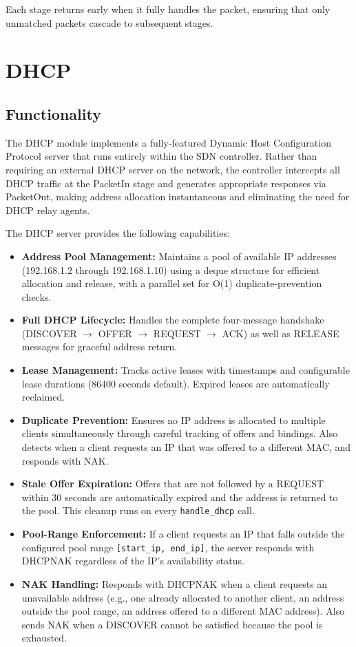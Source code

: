 \documentclass[12pt,a4paper]{article}
\begin{document}
Each stage returns early when it fully handles the packet, ensuring that only unmatched packets cascade to subsequent stages.

\section{DHCP}

\subsection{Functionality}

The DHCP module implements a fully-featured Dynamic Host Configuration Protocol server that runs entirely within the SDN controller. Rather than requiring an external DHCP server on the network, the controller intercepts all DHCP traffic at the PacketIn stage and generates appropriate responses via PacketOut, making address allocation instantaneous and eliminating the need for DHCP relay agents.

The DHCP server provides the following capabilities:

\begin{itemize}[leftmargin=1.5cm]
    \item \textbf{Address Pool Management:} Maintains a pool of available IP addresses (192.168.1.2 through 192.168.1.10) using a deque structure for efficient allocation and release, with a parallel set for O(1) duplicate-prevention checks.
    \item \textbf{Full DHCP Lifecycle:} Handles the complete four-message handshake (DISCOVER $\rightarrow$ OFFER $\rightarrow$ REQUEST $\rightarrow$ ACK) as well as RELEASE messages for graceful address return.
    \item \textbf{Lease Management:} Tracks active leases with timestamps and configurable lease durations (86400 seconds default). Expired leases are automatically reclaimed.
    \item \textbf{Duplicate Prevention:} Ensures no IP address is allocated to multiple clients simultaneously through careful tracking of offers and bindings. Also detects when a client requests an IP that was offered to a different MAC, and responds with NAK.
    \item \textbf{Stale Offer Expiration:} Offers that are not followed by a REQUEST within 30 seconds are automatically expired and the address is returned to the pool. This cleanup runs on every \texttt{handle\_dhcp} call.
    \item \textbf{Pool-Range Enforcement:} If a client requests an IP that falls outside the configured pool range \texttt{[start\_ip, end\_ip]}, the server responds with DHCPNAK regardless of the IP's availability status.
    \item \textbf{NAK Handling:} Responds with DHCPNAK when a client requests an unavailable address (e.g., one already allocated to another client, an address outside the pool range, an address offered to a different MAC address). Also sends NAK when a DISCOVER cannot be satisfied because the pool is exhausted.
\end{itemize}
\end{document}
